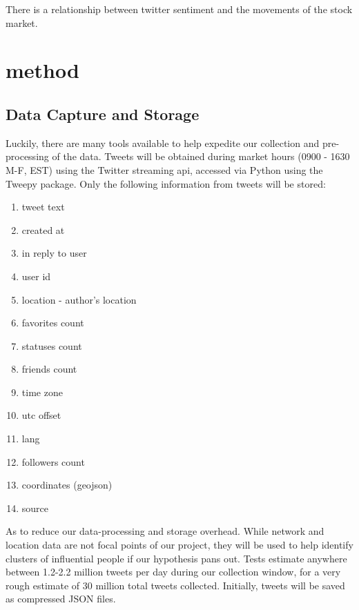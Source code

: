 \documentclass[titlepage]{article}\usepackage[]{graphicx}\usepackage[]{color}
\begin{document}
There is a relationship between twitter sentiment and the movements of the stock market. 

\section{method}

\subsection{Data Capture and Storage}

Luckily, there are many tools available to help expedite our collection and pre-processing of the data. Tweets will be obtained during market hours (0900 - 1630 M-F, EST) using the Twitter streaming api, accessed via Python using the Tweepy package. Only the following information from tweets will be stored:

\begin{enumerate}
\item tweet text
\item created at
\item in reply to user
\item user id
\item location - author’s location
\item favorites count
\item statuses count
\item friends count
\item time zone
\item utc offset
\item lang
\item followers count
\item coordinates (geojson)
\item source
\end{enumerate}

As to reduce our data-processing and storage overhead. While network and location data are not focal points of our project, they will be used to help identify clusters of influential people if our hypothesis pans out. Tests estimate anywhere between 1.2-2.2 million tweets per day during our collection window, for a very rough estimate of 30 million total tweets collected. Initially, tweets will be saved as compressed JSON files. 
\end{document}
